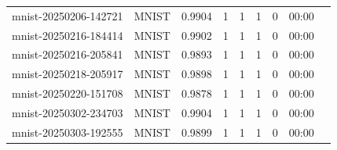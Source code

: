 \begin{tabular}{llrrrrrrr}
mnist-20250206-142721 & MNIST & 0.9904 & 1 & 1 & 1 & 0 & 00:00 \\
mnist-20250216-184414 & MNIST & 0.9902 & 1 & 1 & 1 & 0 & 00:00 \\
mnist-20250216-205841 & MNIST & 0.9893 & 1 & 1 & 1 & 0 & 00:00 \\
mnist-20250218-205917 & MNIST & 0.9898 & 1 & 1 & 1 & 0 & 00:00 \\
mnist-20250220-151708 & MNIST & 0.9878 & 1 & 1 & 1 & 0 & 00:00 \\
mnist-20250302-234703 & MNIST & 0.9904 & 1 & 1 & 1 & 0 & 00:00 \\
mnist-20250303-192555 & MNIST & 0.9899 & 1 & 1 & 1 & 0 & 00:00 \\
\bottomrule
\end{tabular}
